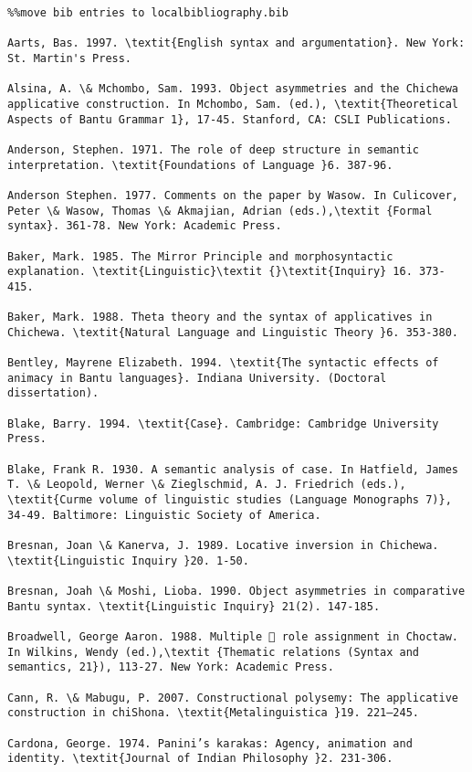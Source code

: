 \documentclass[output=paper]{langsci/langscibook}
\begin{document}
\begin{verbatim}%%move bib entries to localbibliography.bib

Aarts, Bas. 1997. \textit{English syntax and argumentation}. New York: St. Martin's Press.

Alsina, A. \& Mchombo, Sam. 1993. Object asymmetries and the Chichewa applicative construction. In Mchombo, Sam. (ed.), \textit{Theoretical Aspects of Bantu Grammar 1}, 17-45. Stanford, CA: CSLI Publications.

Anderson, Stephen. 1971. The role of deep structure in semantic interpretation. \textit{Foundations of Language }6. 387-96.

Anderson Stephen. 1977. Comments on the paper by Wasow. In Culicover, Peter \& Wasow, Thomas \& Akmajian, Adrian (eds.),\textit {Formal syntax}. 361-78. New York: Academic Press.

Baker, Mark. 1985. The Mirror Principle and morphosyntactic explanation. \textit{Linguistic}\textit {}\textit{Inquiry} 16. 373-415.

Baker, Mark. 1988. Theta theory and the syntax of applicatives in Chichewa. \textit{Natural Language and Linguistic Theory }6. 353-380.

Bentley, Mayrene Elizabeth. 1994. \textit{The syntactic effects of animacy in Bantu languages}. Indiana University. (Doctoral dissertation).

Blake, Barry. 1994. \textit{Case}. Cambridge: Cambridge University Press.

Blake, Frank R. 1930. A semantic analysis of case. In Hatfield, James T. \& Leopold, Werner \& Zieglschmid, A. J. Friedrich (eds.), \textit{Curme volume of linguistic studies (Language Monographs 7)}, 34-49. Baltimore: Linguistic Society of America.

Bresnan, Joan \& Kanerva, J. 1989. Locative inversion in Chichewa. \textit{Linguistic Inquiry }20. 1-50.

Bresnan, Joah \& Moshi, Lioba. 1990. Object asymmetries in comparative Bantu syntax. \textit{Linguistic Inquiry} 21(2). 147-185.

Broadwell, George Aaron. 1988. Multiple  role assignment in Choctaw. In Wilkins, Wendy (ed.),\textit {Thematic relations (Syntax and semantics, 21}), 113-27. New York: Academic Press.

Cann, R. \& Mabugu, P. 2007. Constructional polysemy: The applicative construction in chiShona. \textit{Metalinguistica }19. 221–245.

Cardona, George. 1974. Panini’s karakas: Agency, animation and identity. \textit{Journal of Indian Philosophy }2. 231-306.


\end{verbatim}
\end{document}
